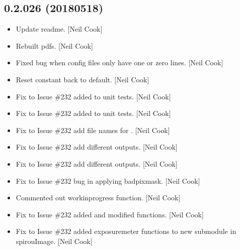 \documentclass[a4paper,10pt,english]{report}
\begin{document}
\subsection{0.2.026 (2018\sphinxhyphen{}05\sphinxhyphen{}18)}
\label{\detokenize{misc/changelog:id452}}\begin{itemize}
\item {} 
Update readme. {[}Neil Cook{]}

\item {} 
Rebuilt pdfs. {[}Neil Cook{]}

\item {} 
Fixed bug when config files only have one or zero lines. {[}Neil Cook{]}

\item {} 
Reset constant back to default. {[}Neil Cook{]}

\item {} 
Fix to Issue \#232 \sphinxhyphen{} added  to unit tests. {[}Neil
Cook{]}

\item {} 
Fix to Issue \#232 \sphinxhyphen{} added  to unit tests. {[}Neil
Cook{]}

\item {} 
Fix to Issue \#232 \sphinxhyphen{} add file names for . {[}Neil Cook{]}

\item {} 
Fix to Issue \#232 \sphinxhyphen{} add different outputs. {[}Neil Cook{]}

\item {} 
Fix to Issue \#232 \sphinxhyphen{} add different outputs. {[}Neil Cook{]}

\item {} 
Fix to Issue \#232 \sphinxhyphen{} bug in applying badpixmask. {[}Neil Cook{]}

\item {} 
Commented out work\sphinxhyphen{}in\sphinxhyphen{}progress function. {[}Neil Cook{]}

\item {} 
Fix to Issue \#232 \sphinxhyphen{} added  and modified
 functions. {[}Neil Cook{]}

\item {} 
Fix to Issue \#232 \sphinxhyphen{} added exposure\sphinxhyphen{}meter functions to new sub\sphinxhyphen{}module
in spirouImage. {[}Neil Cook{]}


\end{itemize}
\end{document}

